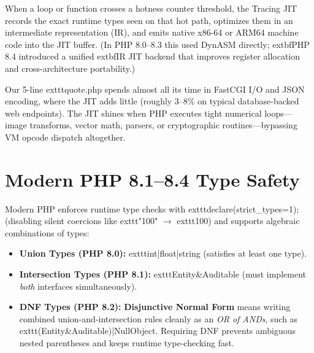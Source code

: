 When a loop or function crosses a hotness counter threshold, the Tracing JIT records the exact runtime types seen on that hot path, optimizes them in an intermediate representation (IR), and emits native x86-64 or ARM64 machine code into the JIT buffer. (In PHP 8.0--8.3 this used DynASM directly; 	extbf{PHP 8.4} introduced a unified 	extbf{IR JIT backend} that improves register allocation and cross-architecture portability.)

\begin{intuitionbox}
Our 5-line 	exttt{quote.php} spends almost all its time in FastCGI I/O and JSON encoding, where the JIT adds little (roughly 3--8\% on typical database-backed web endpoints). The JIT shines when PHP executes tight numerical loops---image transforms, vector math, parsers, or cryptographic routines---bypassing VM opcode dispatch altogether.
\end{intuitionbox}

\section{Modern PHP 8.1--8.4 Type Safety}

Modern PHP enforces runtime type checks with 	exttt{declare(strict\_types=1);} (disabling silent coercions like 	exttt{"100"} $\to$ 	exttt{100}) and supports algebraic combinations of types:
\begin{itemize}[leftmargin=15pt]
  \item \textbf{Union Types (PHP 8.0):} 	exttt{int|float|string} (satisfies at least one type).
  \item \textbf{Intersection Types (PHP 8.1):} 	exttt{Entity\&Auditable} (must implement \emph{both} interfaces simultaneously).
  \item \textbf{DNF Types (PHP 8.2):} \textbf{Disjunctive Normal Form} means writing combined union-and-intersection rules cleanly as an \emph{OR of ANDs}, such as 	exttt{(Entity\&Auditable)|NullObject}. Requiring DNF prevents ambiguous nested parentheses and keeps runtime type-checking fast.
\end{itemize}

